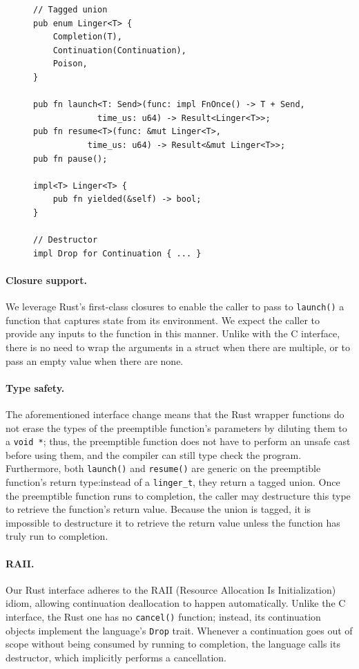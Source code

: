 \begin{figure}
\begin{lstlisting}[label=lst:ingerrustapi,caption=Preemptible functions Rust interface,morekeywords={fn,impl,mut,pub,self,u64,Drop,FnOnce,Result,Send}]
// Tagged union
pub enum Linger<T> {
	Completion(T),
	Continuation(Continuation),
	Poison,
}

pub fn launch<T: Send>(func: impl FnOnce() -> T + Send,
			 time_us: u64) -> Result<Linger<T>>;
pub fn resume<T>(func: &mut Linger<T>,
		   time_us: u64) -> Result<&mut Linger<T>>;
pub fn pause();

impl<T> Linger<T> {
	pub fn yielded(&self) -> bool;
}

// Destructor
impl Drop for Continuation { ... }
\end{lstlisting}
\end{figure}


\paragraph{Closure support.}
We leverage Rust's first-class closures to enable the caller to pass to
\texttt{launch()} a function that captures state from its environment.  We expect the
caller to provide any inputs to the function in this manner.  Unlike with the C
interface, there is no need to wrap the arguments in a struct when there are
multiple, or to pass an empty value when there are none.


\paragraph{Type safety.}
The aforementioned interface change means that the Rust wrapper functions do not
erase the types of the preemptible function's parameters by diluting them to a
\texttt{void *}; thus, the preemptible function does not have to perform an unsafe
cast before using them, and the compiler can still type check the program.
Furthermore, both \texttt{launch()} and \texttt{resume()} are generic on the
preemptible function's return type:\@ instead of a \texttt{linger\_t}, they return a
tagged union.  Once the preemptible function runs to completion, the caller may
destructure this type to retrieve the function's return value.  Because the union is
tagged, it is impossible to destructure it to retrieve the return value unless the
function has truly run to completion.


\paragraph{RAII.}
Our Rust interface adheres to the RAII (Resource Allocation Is Initialization) idiom,
allowing continuation deallocation to happen automatically.  Unlike the C interface,
the Rust one has no \texttt{cancel()} function; instead, its continuation objects
implement the language's \texttt{Drop} trait.  Whenever a continuation goes out of
scope without being consumed by running to completion, the language calls its
destructor, which implicitly performs a cancellation.


